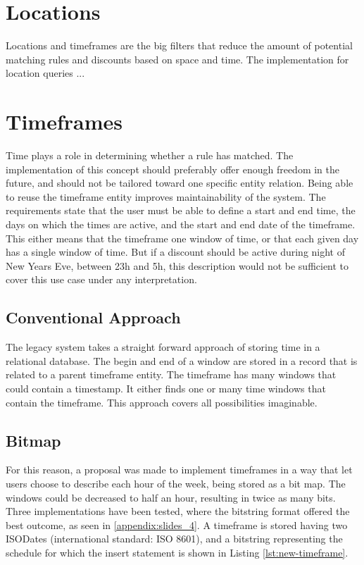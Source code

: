 \section{Locations}
Locations and timeframes are the big filters that reduce the amount of potential matching rules and discounts based on space and time. The implementation for location queries ...


\section{Timeframes}
Time plays a role in determining whether a rule has matched. The implementation of this concept should preferably offer enough freedom in the future, and should not be tailored toward one specific entity relation. Being able to reuse the timeframe entity improves maintainability of the system. The requirements state that the user must be able to define a start and end time, the days on which the times are active, and the start and end date of the timeframe. This either means that the timeframe one window of time, or that each given day has a single window of time. But if a discount should be active during night of New Years Eve, between 23h and 5h, this description would not be sufficient to cover this use case under any interpretation.

\subsection{Conventional Approach}
The legacy system takes a straight forward approach of storing time in a relational database. The begin and end of a window are stored in a record that is related to a parent timeframe entity. The timeframe has many windows that could contain a timestamp. It either finds one or many time windows that contain the timeframe. This approach covers all possibilities imaginable.

\subsection{Bitmap}
For this reason, a proposal was made to implement timeframes in a way that let users choose to describe each hour of the week, being stored as a bit map. The windows could be decreased to half an hour, resulting in twice as many bits. Three implementations have been tested, where the bitstring format offered the best outcome, as seen in \ref{appendix:slides_4}. A timeframe is stored having two ISODates (international standard: ISO 8601), and a bitstring representing the schedule for which the insert statement is shown in Listing \ref{lst:new-timeframe}.

